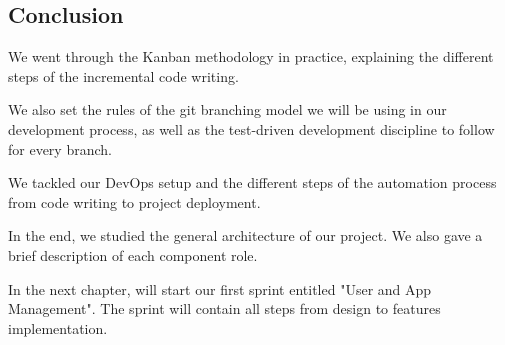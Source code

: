 \begin{spacing}{1.2}
\section*{Conclusion}
We went through the Kanban methodology in practice, explaining the different steps of the incremental code writing.

 We also set the rules of the git branching model we will be using in our development process, as well as the test-driven development discipline to follow for every branch.

We tackled our DevOps setup and the different steps of the automation process from code writing to project deployment.


In the end, we studied the general architecture of our project. We also gave a brief description of each component role.

In the next chapter, will start our first sprint entitled "User and App Management". The sprint will contain all steps from design to features implementation.


\end{spacing}
